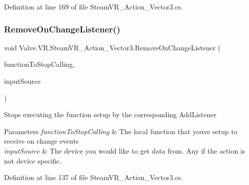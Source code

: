 Definition at line 169 of file Steam\+V\+R\+\_\+\+Action\+\_\+\+Vector3.\+cs.

\mbox{\label{class_valve_1_1_v_r_1_1_steam_v_r___action___vector3_a2517009b114133b34c81a4713c308985}} 
\subsubsection{\texorpdfstring{RemoveOnChangeListener()}{RemoveOnChangeListener()}}
{\footnotesize\ttfamily void Valve.\+V\+R.\+Steam\+V\+R\+\_\+\+Action\+\_\+\+Vector3.\+Remove\+On\+Change\+Listener (\begin{DoxyParamCaption}\item[{\mbox{\hyperlink{class_valve_1_1_v_r_1_1_steam_v_r___action___vector3_a78943f89733a1c1a8e12cb4896e65907}{Change\+Handler}}}]{function\+To\+Stop\+Calling,  }\item[{\mbox{\hyperlink{namespace_valve_1_1_v_r_a82e5bf501cc3aa155444ee3f0662853f}{Steam\+V\+R\+\_\+\+Input\+\_\+\+Sources}}}]{input\+Source }\end{DoxyParamCaption})}



Stops executing the function setup by the corresponding Add\+Listener 


\begin{DoxyParams}{Parameters}
{\em function\+To\+Stop\+Calling} & The local function that you\textquotesingle{}ve setup to receive on change events\\
\hline
{\em input\+Source} & The device you would like to get data from. Any if the action is not device specific.\\
\hline
\end{DoxyParams}


Definition at line 137 of file Steam\+V\+R\+\_\+\+Action\+\_\+\+Vector3.\+cs.

\mbox{\label{class_valve_1_1_v_r_1_1_steam_v_r___action___vector3_af7a0e46c8c8c18fddcce78f9bd31cb3c}} 
